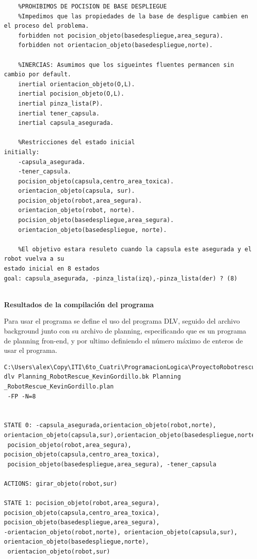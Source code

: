 \documentclass[letterpaper ,10pt]{article}
\begin{document}
{{{{{{\begin{lstlisting}
	%PROHIBIMOS DE POCISION DE BASE DESPLIEGUE 
	%Impedimos que las propiedades de la base de despligue cambien en el proceso del problema.
	forbidden not pocision_objeto(basedespliegue,area_segura). 
	forbidden not orientacion_objeto(basedespliegue,norte).

	%INERCIAS: Asumimos que los sigueintes fluentes permancen sin cambio por default.
	inertial orientacion_objeto(O,L). 	
	inertial pocision_objeto(O,L).  
	inertial pinza_lista(P).
	inertial tener_capsula.
	inertial capsula_asegurada.
	
	%Restricciones del estado inicial
initially:
	-capsula_asegurada.
	-tener_capsula.
	pocision_objeto(capsula,centro_area_toxica).
	orientacion_objeto(capsula, sur).
	pocision_objeto(robot,area_segura).
	orientacion_objeto(robot, norte).
	pocision_objeto(basedespliegue,area_segura).
	orientacion_objeto(basedespliegue, norte).
	
	%El objetivo estara resuleto cuando la capsula este asegurada y el robot vuelva a su 
estado inicial en 8 estados
goal: capsula_asegurada, -pinza_lista(izq),-pinza_lista(der) ? (8) 


\end{lstlisting}
}}

\newpage

{\centerline 
{ \large \textbf{ Resultados de la compilación del programa }
}

\noindent Para usar el programa se define el uso del programa DLV, seguido del archivo background junto con
 su archivo de planning, especificando que es un programa de planning fron-end, y por ultimo definiendo el número máximo de enteros de usar el programa.

\small{
\begin{lstlisting}
C:\Users\alex\Copy\ITI\6to_Cuatri\ProgramacionLogica\ProyectoRobotrescue>
dlv Planning_RobotRescue_KevinGordillo.bk Planning _RobotRescue_KevinGordillo.plan
 -FP -N=8


STATE 0: -capsula_asegurada,orientacion_objeto(robot,norte),
orientacion_objeto(capsula,sur),orientacion_objeto(basedespliegue,norte),
 pocision_objeto(robot,area_segura), pocision_objeto(capsula,centro_area_toxica),
 pocision_objeto(basedespliegue,area_segura), -tener_capsula

ACTIONS: girar_objeto(robot,sur)

STATE 1: pocision_objeto(robot,area_segura), 
pocision_objeto(capsula,centro_area_toxica), 
pocision_objeto(basedespliegue,area_segura), 
-orientacion_objeto(robot,norte), orientacion_objeto(capsula,sur), 
orientacion_objeto(basedespliegue,norte),
 orientacion_objeto(robot,sur)


\end{lstlisting}}}}}}}
\end{document}
